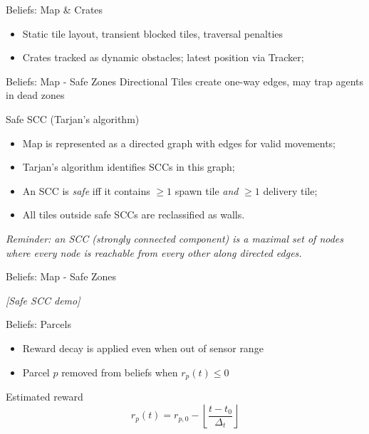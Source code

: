 \begin{frame}{Beliefs: Map \& Crates}
  \begin{itemize}
    \item Static tile layout, transient blocked tiles, traversal penalties
    \item Crates tracked as dynamic obstacles; latest position via Tracker;
  \end{itemize}
\end{frame}

\begin{frame}{Beliefs: Map - Safe Zones}
  Directional Tiles create one-way edges, may trap agents in dead zones
  \begin{block}{Safe SCC (Tarjan's algorithm)}
    \begin{itemize}
        \item Map is represented as a directed graph with edges for valid movements;
        \item Tarjan's algorithm identifies SCCs in this graph;
        \item An SCC is \emph{safe} iff it contains $\geq 1$ spawn tile \emph{and} $\geq 1$ delivery tile;
        \item All tiles outside safe SCCs are reclassified as walls.
    \end{itemize}

  \end{block}
  \footnotesize\textit{Reminder: an SCC (strongly connected component) is a maximal set of nodes where every node is reachable from every other along directed edges.}
\end{frame}

\begin{frame}{Beliefs: Map - Safe Zones}
  \centering
  \begin{block}{}
    \centering\textit{[Safe SCC demo]}
  \end{block}
\end{frame}

\begin{frame}{Beliefs: Parcels}
  \begin{itemize}
    \item Reward decay is applied even when out of sensor range
    \item Parcel $p$ removed from beliefs when $r_p(t) \leq 0$
  \end{itemize}
  \begin{block}{Estimated reward}
    \[ r_p(t) = r_{p,0} - \left\lfloor \frac{t - t_0}{\Delta_t} \right\rfloor \]
  \end{block}
\end{frame}

